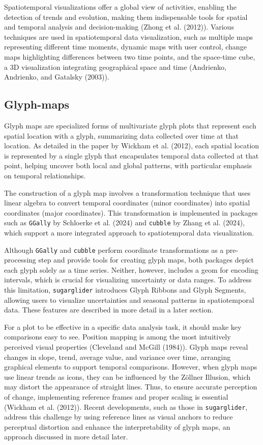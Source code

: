Spatiotemporal visualizations offer a global view of activities, enabling the detection of trends and evolution, making them indispensable tools for spatial and temporal analysis and decision-making (Zhong et al. (2012)). Various techniques are used in spatiotemporal data visualization, such as multiple maps representing different time moments, dynamic maps with user control, change maps highlighting differences between two time points, and the space-time cube, a 3D visualization integrating geographical space and time (Andrienko, Andrienko, and Gatalsky (2003)).

\hypertarget{glyph-maps}{%
\subsection{Glyph-maps}\label{glyph-maps}}

Glyph maps are specialized forms of multivariate glyph plots that represent each spatial location with a glyph, summarizing data collected over time at that location. As detailed in the paper by Wickham et al. (2012), each spatial location is represented by a single glyph that encapsulates temporal data collected at that point, helping uncover both local and global patterns, with particular emphasis on temporal relationships.

The construction of a glyph map involves a transformation technique that uses linear algebra to convert temporal coordinates (minor coordinates) into spatial coordinates (major coordinates). This transformation is implemented in packages such as \texttt{GGally} by Schloerke et al. (2024) and \texttt{cubble} by Zhang et al. (2024), which support a more integrated approach to spatiotemporal data visualization.

Although \texttt{GGally} and \texttt{cubble} perform coordinate transformations as a pre-processing step and provide tools for creating glyph maps, both packages depict each glyph solely as a time series. Neither, however, includes a geom for encoding intervals, which is crucial for visualizing uncertainty or data ranges. To address this limitation, \texttt{sugarglider} introduces Glyph Ribbons and Glyph Segments, allowing users to visualize uncertainties and seasonal patterns in spatiotemporal data. These features are described in more detail in a later section.

For a plot to be effective in a specific data analysis task, it should make key comparisons easy to see. Position mapping is among the most intuitively perceived visual properties (Cleveland and McGill (1984)). Glyph maps reveal changes in slope, trend, average value, and variance over time, arranging graphical elements to support temporal comparisons. However, when glyph maps use linear trends as icons, they can be influenced by the Zöllner Illusion, which may distort the appearance of straight lines. Thus, to ensure accurate perception of change, implementing reference frames and proper scaling is essential (Wickham et al. (2012)). Recent developments, such as those in \texttt{sugarglider}, address this challenge by using reference lines as visual anchors to reduce perceptual distortion and enhance the interpretability of glyph maps, an approach discussed in more detail later.

